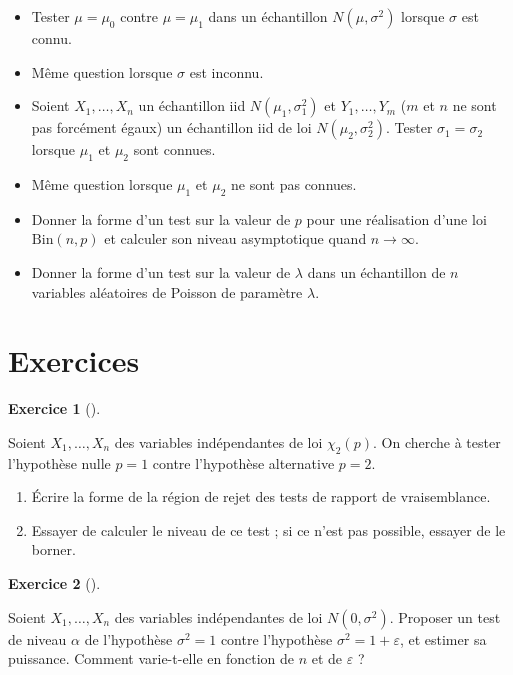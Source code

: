 \documentclass[
  10,
  letterpaper,
  DIV=11,
  numbers=noendperiod]{scrreport}
\providecommand{\tightlist}{%
  \setlength{\itemsep}{0pt}\setlength{\parskip}{0pt}}\usepackage{longtable,booktabs,array}
\theoremstyle{plain}
\theoremstyle{definition}
\newtheorem{exercise}{Exercice}[chapter]
\theoremstyle{plain}
\theoremstyle{definition}
\theoremstyle{definition}
\theoremstyle{plain}
\theoremstyle{remark}
\begin{document}
\begin{itemize}
\tightlist
\item
  Tester \(\mu = \mu_0\) contre \(\mu = \mu_1\) dans un échantillon
  \(N(\mu, \sigma^2)\) lorsque \(\sigma\) est connu.
\item
  Même question lorsque \(\sigma\) est inconnu.
\item
  Soient \(X_1, \dotsc, X_n\) un échantillon iid \(N(\mu_1,\sigma_1^2)\)
  et \(Y_1, \dotsc, Y_m\) (\(m\) et \(n\) ne sont pas forcément égaux)
  un échantillon iid de loi \(N(\mu_2,\sigma_2^2)\). Tester
  \(\sigma_1 = \sigma_2\) lorsque \(\mu_1\) et \(\mu_2\) sont connues.
\item
  Même question lorsque \(\mu_1\) et \(\mu_2\) ne sont pas connues.
\item
  Donner la forme d'un test sur la valeur de \(p\) pour une réalisation
  d'une loi \(\mathrm{Bin}(n,p)\) et calculer son niveau asymptotique
  quand \(n\to\infty\).
\item
  Donner la forme d'un test sur la valeur de \(\lambda\) dans un
  échantillon de \(n\) variables aléatoires de Poisson de paramètre
  \(\lambda\).
\end{itemize}

\hypertarget{exercices-5}{%
\section*{Exercices}\label{exercices-5}}


\begin{exercise}[]\protect\hypertarget{exr-testchideux}{}\label{exr-testchideux}

Soient \(X_1, \dotsc, X_n\) des variables indépendantes de loi
\(\chi_2(p)\). On cherche à tester l'hypothèse nulle \(p=1\) contre
l'hypothèse alternative \(p=2\).

\begin{enumerate}
\def\labelenumi{\arabic{enumi}.}
\tightlist
\item
  Écrire la forme de la région de rejet des tests de rapport de
  vraisemblance.
\item
  Essayer de calculer le niveau de ce test ; si ce n'est pas possible,
  essayer de le borner.
\end{enumerate}

\end{exercise}

\begin{exercise}[]\protect\hypertarget{exr-testvar}{}\label{exr-testvar}

Soient \(X_1, \dotsc, X_n\) des variables indépendantes de loi
\(N(0,\sigma^2)\). Proposer un test de niveau \(\alpha\) de l'hypothèse
\(\sigma^2=1\) contre l'hypothèse \(\sigma^2 = 1+\varepsilon\), et
estimer sa puissance. Comment varie-t-elle en fonction de \(n\) et de
\(\varepsilon\) ?

\end{exercise}
\end{document}
